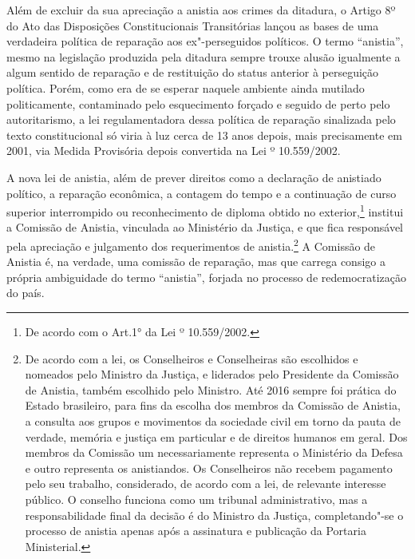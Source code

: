 Além de excluir da sua apreciação a anistia aos crimes da ditadura, o
Artigo 8º do Ato das Disposições Constitucionais Transitórias lançou as
bases de uma verdadeira política de reparação aos ex"-perseguidos
políticos. O termo ``anistia'', mesmo na legislação produzida pela
ditadura sempre trouxe alusão igualmente a algum sentido de reparação e
de restituição do status anterior à perseguição política. Porém, como
era de se esperar naquele ambiente ainda mutilado politicamente,
contaminado pelo esquecimento forçado e seguido de perto pelo
autoritarismo, a lei regulamentadora dessa política de reparação
sinalizada pelo texto constitucional só viria à luz cerca de 13 anos
depois, mais precisamente em 2001, via Medida Provisória depois
convertida na Lei º 10.559/2002.

A nova lei de anistia, além de prever direitos como a declaração de
anistiado político, a reparação econômica, a contagem do tempo e a
continuação de curso superior interrompido ou reconhecimento de diploma
obtido no exterior,\footnote{De acordo com o Art.1° da Lei º
  10.559/2002.} institui a Comissão de Anistia, vinculada ao Ministério
da Justiça, e que fica responsável pela apreciação e julgamento dos
requerimentos de anistia.\footnote{De acordo com a lei, os Conselheiros e
  Conselheiras são escolhidos e nomeados pelo Ministro da Justiça, e
  liderados pelo Presidente da Comissão de Anistia, também escolhido
  pelo Ministro. Até 2016 sempre foi prática do Estado brasileiro, para
  fins da escolha dos membros da Comissão de Anistia, a consulta aos
  grupos e movimentos da sociedade civil em torno da pauta de verdade,
  memória e justiça em particular e de direitos humanos em geral. Dos
  membros da Comissão um necessariamente representa o Ministério da
  Defesa e outro representa os anistiandos. Os Conselheiros não recebem
  pagamento pelo seu trabalho, considerado, de acordo com a lei, de
  relevante interesse público. O conselho funciona como um tribunal
  administrativo, mas a responsabilidade final da decisão é do Ministro
  da Justiça, completando"-se o processo de anistia apenas após a
  assinatura e publicação da Portaria Ministerial.} A Comissão de
Anistia é, na verdade, uma comissão de reparação, mas que carrega
consigo a própria ambiguidade do termo ``anistia'', forjada no processo de
redemocratização do país.

